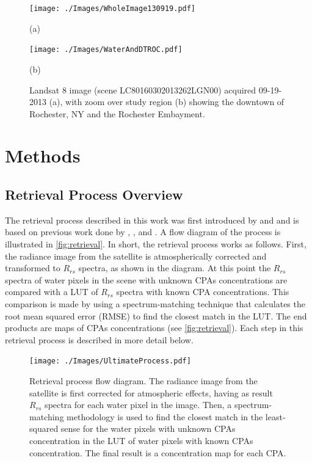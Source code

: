 \documentclass[onecolumn,3p,letterpaper,11pt]{elsarticle}
\begin{document}
\begin{figure}[htbp!]
  	\begin{minipage}[c]{0.48\linewidth}
    	\centering
    	\texttt{[image: ./Images/WholeImage130919.pdf]}
    	\centerline{(a)}\medskip
  	\end{minipage}
  	\hfill
  	\begin{minipage}[d]{0.48\linewidth}
    	\centering
    	\texttt{[image: ./Images/WaterAndDTROC.pdf]}
    	\centerline{(b)}\medskip
    \end{minipage}	

    \caption{Landsat 8 image (scene LC80160302013262LGN00) acquired 09-19-2013 (a), with zoom over study region (b) showing the downtown of Rochester, NY and the Rochester Embayment. \label{fig:L8Image130919} }
\end{figure}

\section{Methods}
\subsection{Retrieval Process Overview}
The retrieval process described in this work was first introduced by \citet{Concha2013IGARSS} and \citet{ConchaThesis2015} and is based on previous work done by \citet{Raqueno:2000}, \citet{Gerace:2012}, \citet{Pahlevan:2012b} and \citet{Gerace:2013}. A flow diagram of the process is illustrated in \autoref{fig:retrieval}. In short, the retrieval process works as follows. First, the radiance image from the satellite is atmospherically corrected and transformed to $R_{rs}$ spectra, as shown in the diagram. At this point the $R_{rs}$ spectra of water pixels in the scene with unknown CPAs concentrations are compared with a LUT of $R_{rs}$ spectra with known CPA concentrations. This comparison is made by using a spectrum-matching technique \citep{Raqueno:2000,Mobley:2005} that calculates the root mean squared error (RMSE) to find the closest match in the LUT. The end products are maps of CPAs concentrations (see \autoref{fig:retrieval}). Each step in this retrieval process is described in more detail below.

\begin{figure}[htb]
  \centering
    \texttt{[image: ./Images/UltimateProcess.pdf]}
    \caption{Retrieval process flow diagram. The radiance image from the satellite is first corrected for atmospheric effects, having as result $R_{rs}$ spectra for each water pixel in the image. Then, a spectrum-matching methodology is used to find the closest match in the least-squared sense for the water pixels with unknown CPAs concentration in the LUT of water pixels with known CPAs concentration. The final result is a concentration map for each CPA.  \label{fig:retrieval} }
\end{figure}
\end{document}
